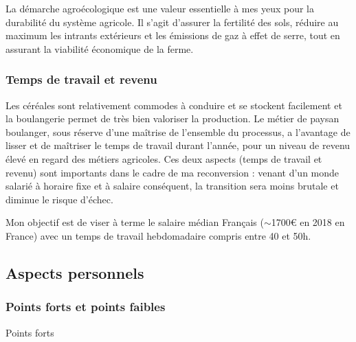 \documentclass{article}
\begin{document}
La démarche agroécologique est une valeur essentielle à mes yeux pour la durabilité du système agricole. Il s'agit d'assurer la fertilité des sols, réduire au maximum les intrants extérieurs et les émissions de gaz à effet de serre, tout en assurant la viabilité économique de la ferme. 

\subsubsection*{Temps de travail et revenu}

Les céréales sont relativement commodes à conduire et se stockent facilement et la boulangerie permet de très bien valoriser la production. Le métier de paysan boulanger, sous réserve d'une maîtrise de l'ensemble du processus, a l'avantage de lisser et de maîtriser le temps de travail durant l'année, pour un niveau de revenu élevé en regard des métiers agricoles. Ces deux aspects (temps de travail et revenu) sont importants dans le cadre de ma reconversion : venant d'un monde salarié à horaire fixe et à salaire conséquent, la transition sera moins brutale et diminue le risque d'échec. 

Mon objectif est de viser à terme le salaire médian Français ($\sim$1700\euro{} en 2018 en France) avec un temps de travail hebdomadaire compris entre 40 et 50h.

\subsection{Aspects personnels}

\subsubsection*{Points forts et points faibles}

Points forts 
\end{document}
